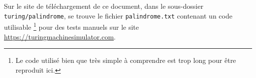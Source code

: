 Sur le site de téléchargement de ce document, dans le sous-dossier \verb+turing/palindrome+, se trouve le fichier \verb+palindrome.txt+ contenant un code utilisable
\footnote{
	Le code utilisé bien que très simple à comprendre est trop long pour être reproduit ici.
}
pour des tests manuels sur le site \url{https://turingmachinesimulator.com}.